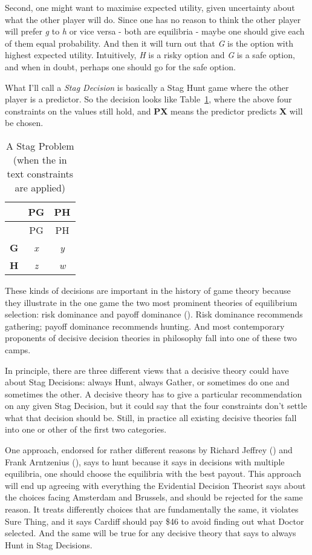 \documentclass[
  10pt,
  letterpaper,
  DIV=11,
  numbers=noendperiod,
  twoside]{scrartcl}
\begin{document}
Second, one might want to maximise expected utility, given uncertainty
about what the other player will do. Since one has no reason to think
the other player will prefer \emph{g} to \emph{h} or vice versa - both
are equilibria - maybe one should give each of them equal probability.
And then it will turn out that \emph{G} is the option with highest
expected utility. Intuitively, \emph{H} is a risky option and \emph{G}
is a safe option, and when in doubt, perhaps one should go for the safe
option.

What I'll call a \emph{Stag Decision} is basically a Stag Hunt game
where the other player is a predictor. So the decision looks like
Table~\ref{tbl-stag-decision}, where the above four constraints on the
values still hold, and \textbf{PX} means the predictor predicts
\textbf{X} will be chosen.

\begin{longtable}[]{@{}lcc@{}}
\caption{A Stag Problem (when the in text constraints are
applied)}\label{tbl-stag-decision}\tabularnewline
\toprule\noalign{}
& PG & PH \\
\midrule\noalign{}
\endfirsthead
\toprule\noalign{}
& PG & PH \\
\midrule\noalign{}
\endhead
\bottomrule\noalign{}
\endlastfoot
\textbf{G} & \emph{x} & \emph{y} \\
\textbf{H} & \emph{z} & \emph{w} \\
\end{longtable}

These kinds of decisions are important in the history of game theory
because they illustrate in the one game the two most prominent theories
of equilibrium selection: risk dominance and payoff dominance
(). Risk
dominance recommends gathering; payoff dominance recommends hunting. And
most contemporary proponents of decisive decision theories in philosophy
fall into one of these two camps.

In principle, there are three different views that a decisive theory
could have about Stag Decisions: always Hunt, always Gather, or
sometimes do one and sometimes the other. A decisive theory has to give
a particular recommendation on any given Stag Decision, but it could say
that the four constraints don't settle what that decision should be.
Still, in practice all existing decisive theories fall into one or other
of the first two categories.

One approach, endorsed for rather different reasons by Richard Jeffrey
() and Frank Arntzenius
(), says to hunt because it says in
decisions with multiple equilibria, one should choose the equilibria
with the best payout. This approach will end up agreeing with everything
the Evidential Decision Theorist says about the choices facing Amsterdam
and Brussels, and should be rejected for the same reason. It treats
differently choices that are fundamentally the same, it violates Sure
Thing, and it says Cardiff should pay \$46 to avoid finding out what
Doctor selected. And the same will be true for any decisive theory that
says to always Hunt in Stag Decisions.
\end{document}
